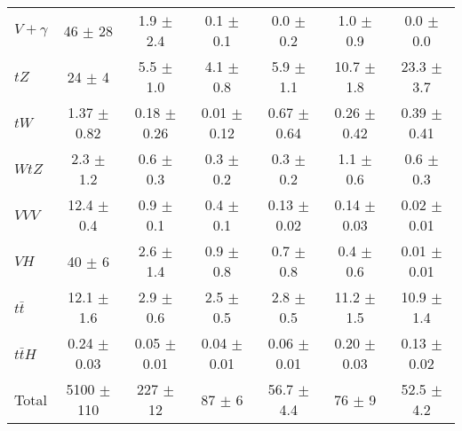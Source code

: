 \begin{tabular}{|l|c|c|c|c|c|c|}
  $V+\gamma$   & 46 $\pm$ 28 & 1.9 $\pm$ 2.4 & 0.1 $\pm$ 0.1 & 0.0 $\pm$ 0.2 & 1.0 $\pm$ 0.9 & 0.0 $\pm$ 0.0 \\ 
  $tZ$   & 24 $\pm$ 4 & 5.5 $\pm$ 1.0 & 4.1 $\pm$ 0.8 & 5.9 $\pm$ 1.1 & 10.7 $\pm$ 1.8 & 23.3 $\pm$ 3.7 \\ 
  $tW$   & 1.37 $\pm$ 0.82 & 0.18 $\pm$ 0.26 & 0.01 $\pm$ 0.12 & 0.67 $\pm$ 0.64 & 0.26 $\pm$ 0.42 & 0.39 $\pm$ 0.41 \\ 
  $WtZ$   & 2.3 $\pm$ 1.2 & 0.6 $\pm$ 0.3 & 0.3 $\pm$ 0.2 & 0.3 $\pm$ 0.2 & 1.1 $\pm$ 0.6 & 0.6 $\pm$ 0.3 \\ 
  $VVV$   & 12.4 $\pm$ 0.4 & 0.9 $\pm$ 0.1 & 0.4 $\pm$ 0.1 & 0.13 $\pm$ 0.02 & 0.14 $\pm$ 0.03 & 0.02 $\pm$ 0.01 \\ 
  $VH$   & 40 $\pm$ 6 & 2.6 $\pm$ 1.4 & 0.9 $\pm$ 0.8 & 0.7 $\pm$ 0.8 & 0.4 $\pm$ 0.6 & 0.01 $\pm$ 0.01 \\ 
  $t\bar{t}$   & 12.1 $\pm$ 1.6 & 2.9 $\pm$ 0.6 & 2.5 $\pm$ 0.5 & 2.8 $\pm$ 0.5 & 11.2 $\pm$ 1.5 & 10.9 $\pm$ 1.4 \\ 
  $t\bar{t}H$   & 0.24 $\pm$ 0.03 & 0.05 $\pm$ 0.01 & 0.04 $\pm$ 0.01 & 0.06 $\pm$ 0.01 & 0.20 $\pm$ 0.03 & 0.13 $\pm$ 0.02 \\ 
\hline 
  Total  & 5100 $\pm$ 110 & 227 $\pm$ 12 & 87 $\pm$ 6 & 56.7 $\pm$ 4.4 & 76 $\pm$ 9 & 52.5 $\pm$ 4.2 \\ 
\hline 
\end{tabular} 
